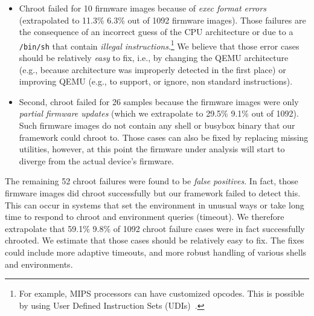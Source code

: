 \documentclass[conference]{./templates/ndss/IEEEtran}
\newcounter{t0d0_counter}
\newcounter{pr00f_counter}
\newcommand{\CountFirmwareEmulatedNOTOK}{1092}
\newcommand{\EmulatedNOTOKRandSamplChrootDetectFail}{52}
\newcommand{\EmulatedNOTOKRandSamplChrootDetectFailPct}{59.1\%}
\newcommand{\EmulatedNOTOKRandSamplChrootDetectFailConfInt}{9.8\%}
\newcommand{\EmulatedNOTOKRandSamplChrootFailExecFormat}{10}
\newcommand{\EmulatedNOTOKRandSamplChrootFailExecFormatPct}{11.3\%}
\newcommand{\EmulatedNOTOKRandSamplChrootFailExecFormatConfInt}{6.3\%}
\newcommand{\EmulatedNOTOKRandSamplChrootFailFS}{26}
\newcommand{\EmulatedNOTOKRandSamplChrootFailFSPct}{29.5\%}
\newcommand{\EmulatedNOTOKRandSamplChrootFailFSConfInt}{9.1\%}
\begin{document}
\begin{itemize}

\item Chroot failed for \EmulatedNOTOKRandSamplChrootFailExecFormat{} 
firmware images because of \emph{exec format errors} (extrapolated 
to \EmulatedNOTOKRandSamplChrootFailExecFormatPct{}  
\EmulatedNOTOKRandSamplChrootFailExecFormatConfInt{} out 
of \CountFirmwareEmulatedNOTOK{} firmware images). 
Those failures are the consequence of an incorrect guess of the CPU architecture or 
due to a \texttt{/bin/sh} that contain \emph{illegal instructions}.\footnote{
For example, MIPS processors can have customized opcodes. This is possible 
by using User Defined Instruction Sets (UDIs)~\cite{ienne2006customizable}.}
We believe that those error cases should be relatively \emph{easy} to fix, 
i.e., by changing the QEMU architecture (e.g., because architecture was improperly 
detected in the first place) or improving QEMU (e.g., to support, or ignore, non standard instructions). 

\item  Second, chroot failed for \EmulatedNOTOKRandSamplChrootFailFS{} 
samples because the firmware images were only \emph{partial firmware updates} 
(which we extrapolate to \EmulatedNOTOKRandSamplChrootFailFSPct{}  
\EmulatedNOTOKRandSamplChrootFailFSConfInt{} out of \CountFirmwareEmulatedNOTOK{}).
Such firmware images do not contain any shell or busybox binary that our framework 
could chroot to. 
Those cases can also be fixed by replacing missing utilities, however,
at this point the firmware under analysis will start to diverge from
the actual device's firmware.

\end{itemize}

    The remaining \EmulatedNOTOKRandSamplChrootDetectFail{}  chroot failures were 
found to be \emph{false positives}. In fact, those firmware images 
did  chroot successfully but our framework failed to detect this.
This can occur in systems that set the environment in unusual ways or 
take long time to respond to chroot and environment queries (timeout). 
We therefore extrapolate that \EmulatedNOTOKRandSamplChrootDetectFailPct{}  
\EmulatedNOTOKRandSamplChrootDetectFailConfInt{} of \CountFirmwareEmulatedNOTOK{} 
chroot failure cases were in fact successfully chrooted. 
We estimate that those cases should be relatively easy to fix. The fixes could include more 
adaptive timeouts, and more robust handling of various shells and 
environments. 
\end{document}
